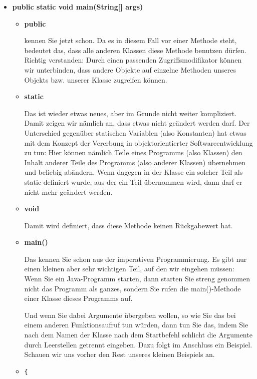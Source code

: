 \begin{itemize}
	\item \textbf{public static void main(String[] args)}
	
	\begin{itemize}
		\item \textbf{public}
		
		kennen Sie jetzt schon. Da es in diesem Fall vor einer Methode steht, bedeutet das, dass alle anderen Klassen diese Methode benutzen dürfen. Richtig verstanden: Durch einen passenden Zugriffsmodifikator können wir unterbinden, dass andere Objekte auf einzelne Methoden unseres Objekts bzw. unserer Klasse zugreifen können.
		
		\item \textbf{static}
		
		Das ist wieder etwas neues, aber im Grunde nicht weiter kompliziert. Damit zeigen wir nämlich an, dass etwas nicht geändert werden darf. Der Unterschied gegenüber statischen Variablen (also Konstanten) hat etwas mit dem Konzept der Vererbung in objektorientierter Softwareentwicklung zu tun: Hier können nämlich Teile eines Programms (also Klassen) den Inhalt anderer Teile des Programms (also anderer Klassen) übernehmen und beliebig abändern. Wenn dagegen in der Klasse ein solcher Teil als static definiert wurde, aus der ein Teil übernommen wird, dann darf er nicht mehr geändert werden.
		
		\item \textbf{void}
		
		Damit wird definiert, dass diese Methode keinen Rückgabewert hat.
		
		\item \textbf{main()}
		
		Das kennen Sie schon aus der imperativen Programmierung. Es gibt nur einen kleinen aber sehr wichtigen Teil, auf den wir eingehen müssen: Wenn Sie ein Java-Programm \glqq{}starten\grqq{}, dann \glqq{}starten\grqq{} Sie streng genommen nicht das Programm als ganzes, sondern Sie rufen die main()-Methode einer Klasse dieses Programms auf.
		
		Und wenn Sie dabei Argumente übergeben wollen, so wie Sie das bei einem anderen Funktionsaufruf tun würden, dann tun Sie das, indem Sie nach dem Namen der Klasse nach dem \glqq{}Startbefehl\grqq{} schlicht die Argumente durch Leerstellen getrennt eingeben. Dazu folgt im Anschluss ein Beispiel. Schauen wir uns vorher den Rest unseres kleinen Beispiels an.
		
		\item \verb|{|
		

\end{itemize}
\end{itemize}
